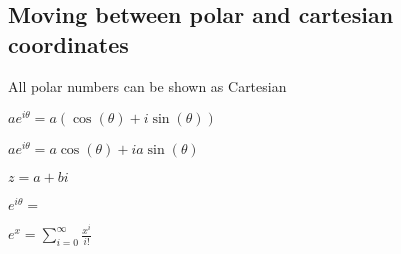 
\subsection{Moving between polar and cartesian coordinates}

All polar numbers can be shown as Cartesian

$ae^{i\theta }=a(\cos(\theta )+i\sin(\theta ))$

$ae^{i\theta }=a\cos(\theta )+ia\sin(\theta )$

\(z=a+bi\)

\(e^{i\theta }=\)

$e^x=\sum^{\infty }_{i=0} \frac{x^i}{i!}$

